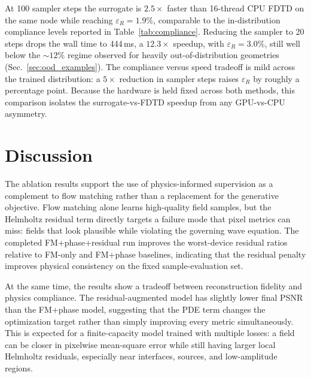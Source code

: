 \documentclass[%
 reprint,
 amsmath,amssymb,
 aps,
floatfix,
]{revtex4-2}
\begin{document}
At 100 sampler steps the surrogate is $2.5\times$ faster than 16-thread CPU FDTD on the same node while reaching $\varepsilon_R=1.9\%$, comparable to the in-distribution compliance levels reported in Table~\ref{tab:compliance}. Reducing the sampler to 20 steps drops the wall time to 444\,ms, a $12.3\times$ speedup, with $\varepsilon_R=3.0\%$, still well below the $\sim\!12\%$ regime observed for heavily out-of-distribution geometries (Sec.~\ref{sec:ood_examples}). The compliance versus speed tradeoff is mild across the trained distribution: a $5\times$ reduction in sampler steps raises $\varepsilon_R$ by roughly a percentage point. Because the hardware is held fixed across both methods, this comparison isolates the surrogate-vs-FDTD speedup from any GPU-vs-CPU asymmetry.

\section{\label{sec:level7}Discussion}

The ablation results support the use of physics-informed supervision as a complement to flow matching rather than a replacement for the generative objective. Flow matching alone learns high-quality field samples, but the Helmholtz residual term directly targets a failure mode that pixel metrics can miss: fields that look plausible while violating the governing wave equation. The completed FM+phase+residual run improves the worst-device residual ratios relative to FM-only and FM+phase baselines, indicating that the residual penalty improves physical consistency on the fixed sample-evaluation set.

At the same time, the results show a tradeoff between reconstruction fidelity and physics compliance. The residual-augmented model has slightly lower final PSNR than the FM+phase model, suggesting that the PDE term changes the optimization target rather than simply improving every metric simultaneously. This is expected for a finite-capacity model trained with multiple losses: a field can be closer in pixelwise mean-square error while still having larger local Helmholtz residuals, especially near interfaces, sources, and low-amplitude regions.
\end{document}

